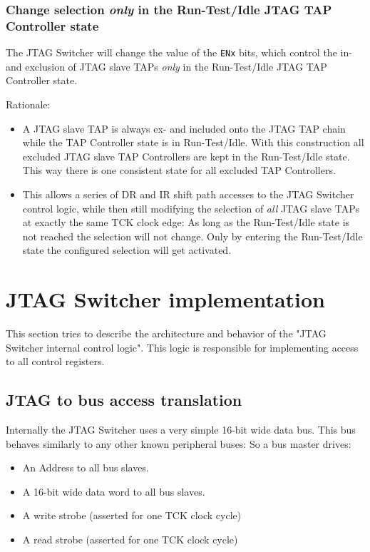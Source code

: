 \documentclass[10pt,english,a4paper]{report}
\begin{document}
\subsection{Change selection {\em only} in the Run-Test/Idle JTAG TAP Controller state}
The JTAG Switcher will change the value of the {\tt ENx} bits,
which control the in- and exclusion of JTAG slave TAPs {\em only} in the Run-Test/Idle JTAG
TAP Controller state.

Rationale:
\begin{itemize}
\item A JTAG slave TAP is always ex- and included onto the JTAG TAP chain while the
TAP Controller state is in Run-Test/Idle. With this construction all excluded
JTAG slave TAP Controllers are kept in the Run-Test/Idle state. This way there is one
consistent state for all excluded TAP Controllers.
\item This allows a series of DR and IR shift path accesses to the JTAG Switcher control
logic, while then still modifying the selection of {\em all} JTAG slave TAPs at exactly the same
TCK clock edge: As long as the Run-Test/Idle state is not reached the selection will not change.
Only by entering the Run-Test/Idle state the configured selection will get activated.
\end{itemize}

\chapter{JTAG Switcher implementation}
This section tries to describe the architecture and behavior of the
"JTAG Switcher internal control logic". This logic is responsible
for implementing access to all control registers.

\section{JTAG to bus access translation}
Internally the JTAG Switcher uses a very simple 16-bit wide data bus.
This bus behaves similarly to any other known peripheral buses: So a
bus master drives:
\begin{itemize}
\item An Address to all bus slaves.
\item A 16-bit wide data word to all bus slaves.
\item A write strobe (asserted for one TCK clock cycle)
\item A read strobe (asserted for one TCK clock cycle)
\end{itemize}
\end{document}
